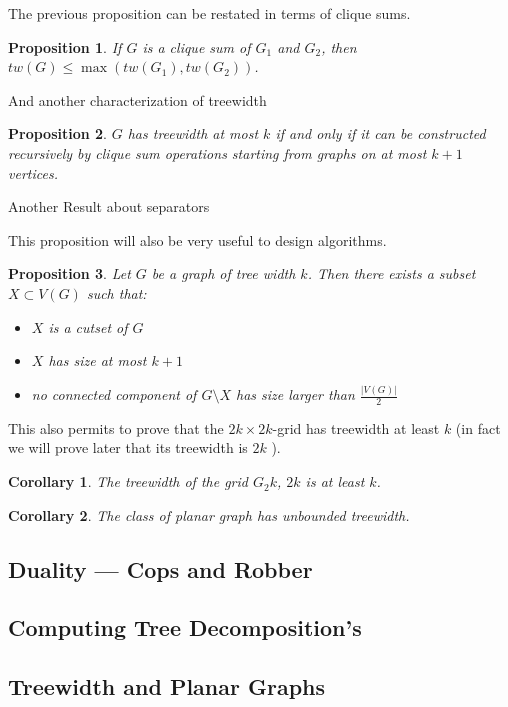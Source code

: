 \documentclass[12pt,a4paper]{article}
\newtheorem{prop}{Proposition}
\newtheorem{corollary}{Corollary}
\begin{document}
The previous proposition can be restated in terms of clique sums.

\begin{prop}
  If $G$ is a clique sum of $G_1$ and $G_2$, then
  $tw( G ) \leq \max(tw( G_1 ), tw( G_2 ))$.
\end{prop}

And another characterization of treewidth

\begin{prop}
  $G$ has treewidth at most $k$ if and only if it can be constructed recursively
  by clique sum operations starting from graphs on at most $k + 1$ vertices.
\end{prop}

Another Result about separators

This proposition will also be very useful to design algorithms.
\begin{prop}
  Let $G$ be a graph of tree width $k$. Then there exists a subset
  $X \subset V ( G )$ such that:
  \begin{itemize}
  \item $X$ is a cutset of $G$
  \item $X$ has size at most $k + 1$
  \item no connected component of $G \setminus X$ has size larger than
    $\frac{| V ( G )|}{2}$
  \end{itemize}
\end{prop}

This also permits to prove that the $2k \times 2k$-grid has treewidth at least
$k$ (in fact we will prove later that its treewidth is $2k$ ).

\begin{corollary}
  The treewidth of the grid $G_2k$, $2k$ is at least $k$.
\end{corollary}

\begin{corollary}
  The class of planar graph has unbounded treewidth.
\end{corollary}


\subsection{Duality --- Cops and Robber}
\subsection{Computing Tree Decomposition's}
\subsection{Treewidth and Planar Graphs}
\end{document}
